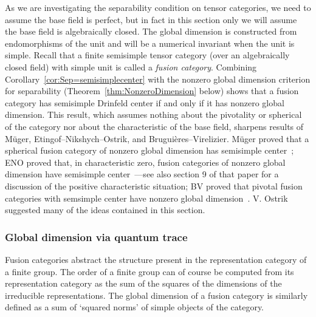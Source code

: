\documentclass{amsart}
\begin{document}
As we are investigating the separability condition on tensor categories, we need to assume the base field is perfect, but in fact in this section only we will assume the base field is algebraically closed.  The global dimension is constructed from endomorphisms of the unit and will be a numerical invariant when the unit is simple.  Recall that a finite semisimple tensor category (over an algebraically closed field) with simple unit is called a \emph{fusion category}.  Combining Corollary~\ref{cor:Sep=semisimplecenter} with the nonzero global dimension criterion for separability (Theorem~\ref{thm:NonzeroDimension} below) shows that a fusion category has semisimple Drinfeld center if and only if it has nonzero global dimension.  This result, which assumes nothing about the pivotality or spherical of the category nor about the characteristic of the base field, sharpens results of M\"uger, Etingof--Nikshych--Ostrik, and Brugui\`eres--Virelizier.  M\"uger proved that a spherical fusion category of nonzero global dimension has semisimple center~\cite[Thm. 3.16]{MR1966525}; ENO proved that, in characteristic zero, fusion categories of nonzero global dimension have semisimple center~\cite[Thm. 2.15]{MR2183279}---see also section 9 of that paper for a discussion of the positive characteristic situation; BV proved that pivotal fusion categories with semsimple center have nonzero global dimension~\cite{MR3079759}.  V. Ostrik suggested many of the ideas contained in this section.

\subsubsection{Global dimension via quantum trace} \label{sec:gdim}

Fusion categories abstract the structure present in the representation category of a finite group.  The order of a finite group can of course be computed from its representation category as the sum of the squares of the dimensions of the irreducible representations.  The global dimension of a fusion category is similarly defined as a sum of `squared norms' of simple objects of the category.  
\end{document}
